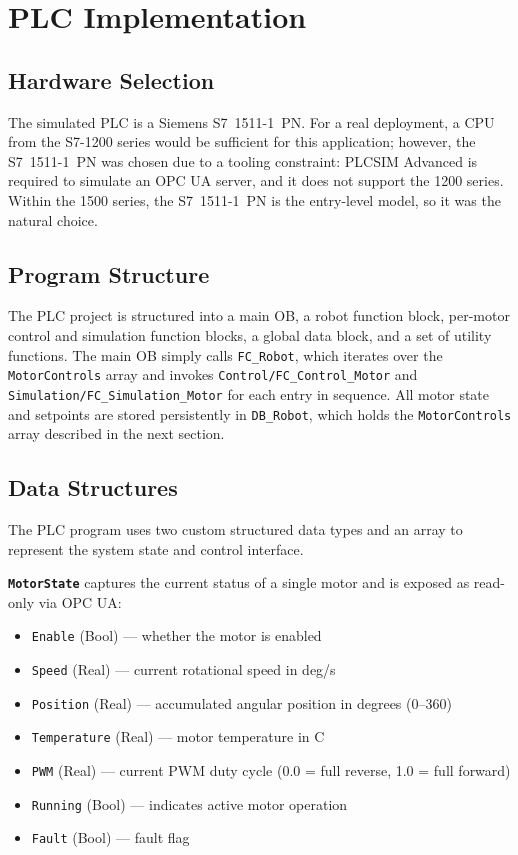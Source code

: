 \documentclass[a4paper,11pt]{article}
\newcommand{\tyMotorState}{\texttt{MotorState}}
\newcommand{\tyMotorControls}{\texttt{MotorControls}}
\newcommand{\cpuModel}{S7~1511-1~PN}
\newcommand{\fcRobot}{\texttt{FC\_Robot}}
\newcommand{\dbRobot}{\texttt{DB\_Robot}}
\newcommand{\fcControlMotor}{\texttt{Control/FC\_Control\_Motor}}
\newcommand{\fcSimMotor}{\texttt{Simulation/FC\_Simulation\_Motor}}
\newcommand{\fEnable}{\texttt{Enable}}
\newcommand{\fSpeed}{\texttt{Speed}}
\newcommand{\fPosition}{\texttt{Position}}
\newcommand{\fTemperature}{\texttt{Temperature}}
\newcommand{\fPWM}{\texttt{PWM}}
\newcommand{\fRunning}{\texttt{Running}}
\newcommand{\fFault}{\texttt{Fault}}
\begin{document}
\section{PLC Implementation}
\label{sec:plc}

\subsection{Hardware Selection}

The simulated PLC is a Siemens \cpuModel{}. For a real deployment, a CPU from the S7-1200 series
would be sufficient for this application; however, the \cpuModel{} was chosen due to a tooling
constraint: PLCSIM Advanced is required to simulate an OPC UA server, and it does not support the
1200 series. Within the 1500 series, the \cpuModel{} is the entry-level model, so it was the
natural choice.

\subsection{Program Structure}

The PLC project is structured into a main OB, a robot function block, per-motor control and
simulation function blocks, a global data block, and a set of utility functions.
The main OB simply calls \fcRobot{}, which iterates over the \tyMotorControls{} array and invokes
\fcControlMotor{} and \fcSimMotor{} for each entry in sequence.
All motor state and setpoints are stored persistently in \dbRobot{}, which holds the
\tyMotorControls{} array described in the next section.

\subsection{Data Structures}
\label{sec:plc-data-structures}

The PLC program uses two custom structured data types and an array to represent the system state and
control interface.

\textbf{\tyMotorState} captures the current status of a single motor and is exposed as read-only via
OPC UA:

\begin{itemize}
    \item \fEnable{} (Bool) --- whether the motor is enabled
    \item \fSpeed{} (Real) --- current rotational speed in deg/s
    \item \fPosition{} (Real) --- accumulated angular position in degrees (0--360)
    \item \fTemperature{} (Real) --- motor temperature in \textdegree{}C
    \item \fPWM{} (Real) --- current PWM duty cycle (0.0 = full reverse, 1.0 = full forward)
    \item \fRunning{} (Bool) --- indicates active motor operation
    \item \fFault{} (Bool) --- fault flag
\end{itemize}
\end{document}
